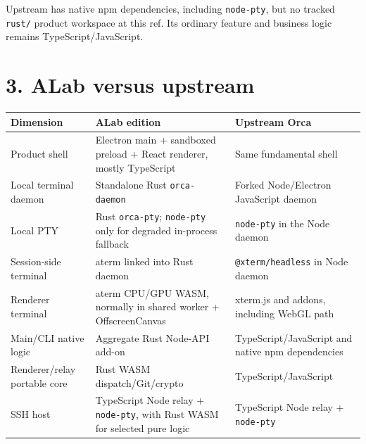 \documentclass[
  10pt,
  letterpaper,
]{article}
\newcounter{none} %
\begin{document}
Upstream has native npm dependencies, including \texttt{node-pty}, but
no tracked \texttt{rust/} product workspace at this ref. Its ordinary
feature and business logic remains TypeScript/JavaScript.

\section{3. ALab versus upstream}\label{3-alab-versus-upstream}

{\def\LTcaptype{none} %
\begin{longtable}[]{@{}
  >{\raggedright\arraybackslash}p{}
  >{\raggedright\arraybackslash}p{}
  >{\raggedright\arraybackslash}p{}@{}}
\toprule\noalign{}
\rowcolor{accent!12}
\begin{minipage}[b]{\linewidth}\raggedright
Dimension
\end{minipage} & \begin{minipage}[b]{\linewidth}\raggedright
ALab edition
\end{minipage} & \begin{minipage}[b]{\linewidth}\raggedright
Upstream Orca
\end{minipage} \\
\midrule\noalign{}
\endhead
\bottomrule\noalign{}
\endlastfoot
Product shell & Electron main + sandboxed preload + React renderer,
mostly TypeScript & Same fundamental shell \\
Local terminal daemon & Standalone Rust \texttt{orca-daemon} & Forked
Node/Electron JavaScript daemon \\
Local PTY & Rust \texttt{orca-pty}; \texttt{node-pty} only for degraded
in-process fallback & \texttt{node-pty} in the Node daemon \\
Session-side terminal & aterm linked into Rust daemon &
\texttt{@xterm/headless} in Node daemon \\
Renderer terminal & aterm CPU/GPU WASM, normally in shared worker +
OffscreenCanvas & xterm.js and addons, including WebGL path \\
Main/CLI native logic & Aggregate Rust Node-API add-on &
TypeScript/JavaScript and native npm dependencies \\
Renderer/relay portable core & Rust WASM dispatch/Git/crypto &
TypeScript/JavaScript \\
SSH host & TypeScript Node relay + \texttt{node-pty}, with Rust WASM for
selected pure logic & TypeScript Node relay + \texttt{node-pty} \\

\end{longtable}}
\end{document}
